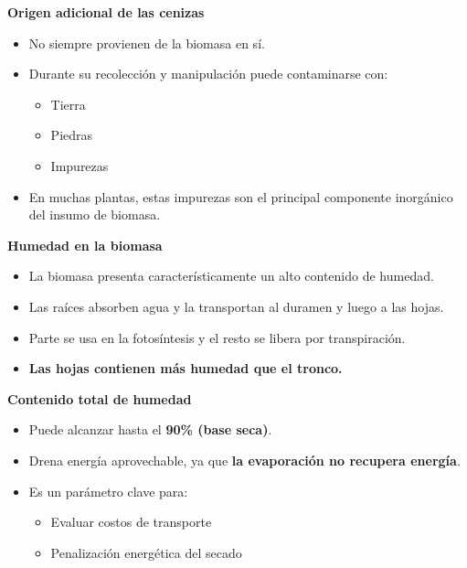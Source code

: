 \documentclass[../../main.tex]{subfiles}
\begin{document}
\begin{frame}{\textbf{Origen adicional de las cenizas}}
\begin{itemize}
    \item No siempre provienen de la biomasa en s\'i.
    \item Durante su recolecci\'on y manipulaci\'on puede contaminarse con:
    \begin{itemize}
        \item Tierra
        \item Piedras
        \item Impurezas
    \end{itemize}
    \item En muchas plantas, estas impurezas son el principal componente inorg\'anico del insumo de biomasa.
\end{itemize}
\end{frame}
\begin{frame}{\textbf{Humedad en la biomasa}}
\begin{itemize}
    \item La biomasa presenta caracter\'isticamente un alto contenido de humedad.
    \item Las ra\'ices absorben agua y la transportan al duramen y luego a las hojas.
    \item Parte se usa en la fotos\'intesis y el resto se libera por transpiraci\'on.
    \item \textbf{Las hojas contienen m\'as humedad que el tronco.}
\end{itemize}


\textbf{Contenido total de humedad}
\begin{itemize}
    \item Puede alcanzar hasta el \textbf{90\% (base seca)}.
    \item Drena energ\'ia aprovechable, ya que \textbf{la evaporaci\'on no recupera energ\'ia}.
    \item Es un par\'ametro clave para:
    \begin{itemize}
        \item Evaluar costos de transporte
        \item Penalizaci\'on energ\'etica del secado
    \end{itemize}
\end{itemize}
\end{frame}
\end{document}
